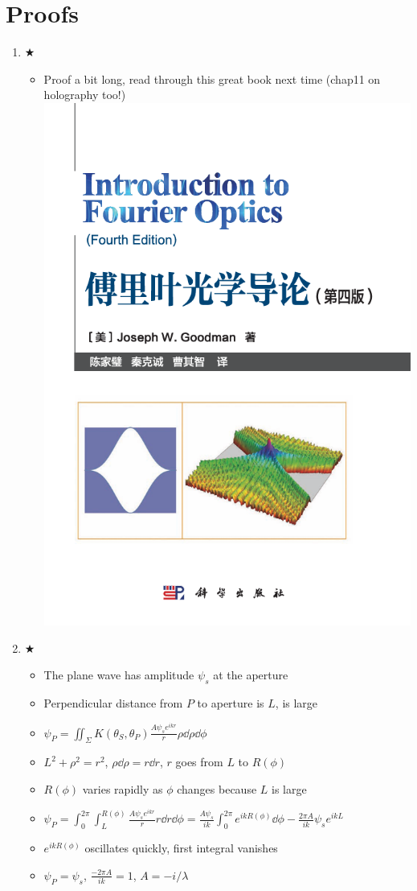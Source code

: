 \documentclass{article}
\theoremstyle{remark}
\theoremstyle{remark}
\newcommand{\myref}[1]{\hyperref[back:#1]{$\bigstar$}\label{#1}}
\begin{document}
\section*{Proofs}
\begin{enumerate}
    \item \myref{obliquity_factor}\begin{itemize}
            \item Proof a bit long, read through this great book next time (chap11 on holography too!)
            \includegraphics*[width=0.2\linewidth]{book_cover.png}
        \end{itemize}
    \item \myref{FKdiffIntegral}\begin{itemize}
            \item The plane wave has amplitude $\psi_s$ at the aperture
            \item Perpendicular distance from $P$ to aperture is $L$, is large
            \item $\psi_P=\iint_\Sigma K(\theta_S,\theta_P)\frac{A\psi_se^{ikr}}{r}\rho\dd\rho\dd\phi$
            \item $L^2+\rho^2=r^2$, $\rho\dd\rho=r\dd r$, $r$ goes from $L$ to $R(\phi)$
            \item $R(\phi)$ varies rapidly as $\phi$ changes because $L$ is large
            \item $\psi_P=\int_0^{2\pi}\int_L^{R(\phi)}\frac{A\psi_s e^{ikr}}{r}r\dd r\dd\phi=\frac{A\psi_s}{ik}\int_0^{2\pi}e^{ikR(\phi)}\dd\phi - \frac{2\pi A}{ik}\psi_se^{ikL}$
            \item $e^{ikR(\phi)}$ oscillates quickly, first integral vanishes
            \item $\psi_P=\psi_s$, $\frac{-2\pi A}{ik} = 1$, $\boxed{A = -i/\lambda}$
        \end{itemize}
\end{enumerate}
\end{document}
